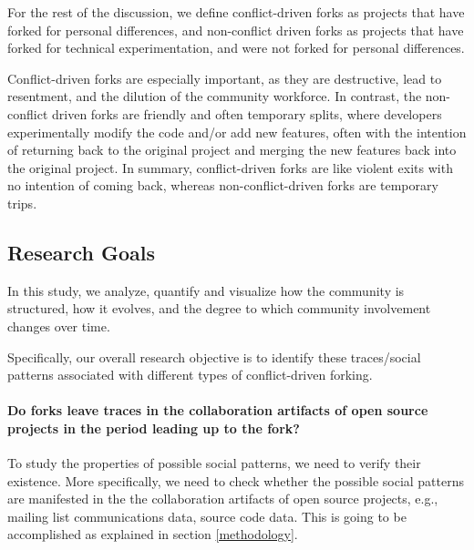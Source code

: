 \documentclass[12pt]{report}
\begin{document}

For the rest of the discussion, we define conflict-driven forks as projects that have forked for personal differences, and non-conflict driven forks as projects that have forked for technical experimentation, and were not forked for personal differences. 

Conflict-driven forks are especially important, as they are destructive, lead to resentment, and the dilution of the community workforce. In contrast, the non-conflict driven forks are friendly and often temporary splits, where developers experimentally modify the code and/or add new features, often with the intention of returning back to the original project and merging the new features back into the original project. In summary, conflict-driven forks are like violent exits with no intention of coming back, whereas non-conflict-driven forks are temporary trips.


\subsection{Research Goals}

In this study, we analyze, quantify and visualize how the community is structured, how it evolves, and the degree to which community involvement changes over time. 

Specifically, our overall research objective is to identify these traces/social patterns associated with different types of conflict-driven forking. 

\paragraph*{\hspace{4 mm} Do forks leave traces in the collaboration artifacts of open source projects in the period leading up to the fork?\\}

To study the properties of possible social patterns, we need to verify their existence. More specifically, we need to check whether the possible social patterns are manifested in the the collaboration artifacts of open source projects, e.g., mailing list communications data, source code data. This is going to be accomplished as explained in section \ref{methodology}.
\end{document}
